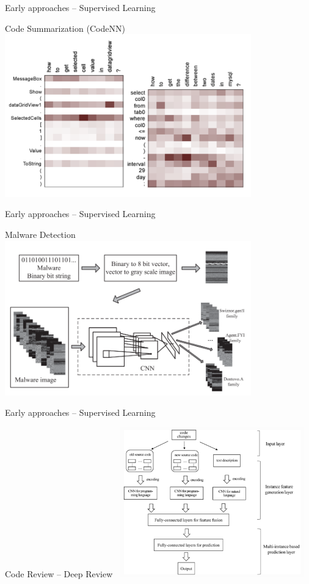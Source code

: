 \documentclass[presentation, 10pt]{beamer}\mode<presentation>{\usetheme{AMSBolognaFC}}
\begin{document}
\begin{frame}{Early approaches -- Supervised Learning}
\begin{exampleblock}{Code Summarization (CodeNN)~\cite{DBLP:conf/acl/IyerKCZ16}}
\centering
\includegraphics[width=0.8\textwidth]{img/codenn.png}
\end{exampleblock}
\end{frame}
\begin{frame}{Early approaches -- Supervised Learning}
\begin{exampleblock}{Malware Detection~\cite{DBLP:journals/tii/CuiXCCWC18}}
\centering
\includegraphics[width=0.8\textwidth]{img/malware-detection.png}
\end{exampleblock}
\end{frame}
\begin{frame}{Early approaches -- Supervised Learning}
\begin{exampleblock}{Code Review -- Deep Review~\cite{DBLP:conf/pakdd/LiSTHXLL19}}
\centering
\includegraphics[width=0.6\textwidth]{img/deep-review.png}
\end{exampleblock}
\end{frame}
\end{document}
